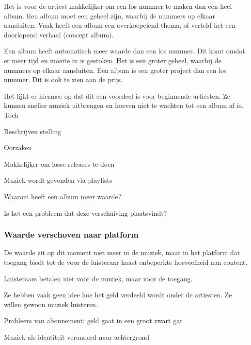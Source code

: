 Het is voor de artiest makkelijker om een los nummer te maken dan een heel album. Een album moet een geheel zijn, waarbij de nummers op elkaar aansluiten. Vaak heeft een album een overkoepelend thema, of verteld het een doorlopend verhaal (concept album).

Een album heeft automatisch meer waarde dan een los nummer. Dit komt omdat er meer tijd en moeite in is gestoken. Het is een groter geheel, waarbij de nummers op elkaar aansluiten. Een album is een groter project dan een los nummer. Dit is ook te zien aan de prijs.

Het lijkt er hiermee op dat dit een voordeel is voor beginnende artiesten. Ze kunnen sneller muziek uitbrengen en hoeven niet te wachten tot een album af is. Toch 

\begin{todolist}
  \item[\done] Beschrijven stelling
  \item[\done] Oorzaken
  \begin{todolist}
    \item[\done] Makkelijker om losse releases te doen
    \item[\done] Muziek wordt gevonden via playlists
  \end{todolist}
  \item Waarom heeft een album meer waarde?
  \item Is het een probleem dat deze verschuiving plaatsvindt?
\end{todolist}

\subsubsection*{Waarde verschoven naar platform}
\begin{quotebox}
De waarde zit op dit moment niet meer in de muziek, maar in het platform dat toegang biedt tot de voor de luisteraar haast onbeperkte hoeveelheid aan content.
\end{quotebox}
\begin{todolist}
  \item Luisteraars betalen niet voor de muziek, maar voor de toegang.
  \item Ze hebben vaak geen idee hoe het geld verdeeld wordt onder de artiesten. Ze willen gewoon muziek luisteren.
  \item Probleem van abonnement: geld gaat in een groot zwart gat
  \item Muziek als identiteit veranderd naar achtergrond
\end{todolist}

